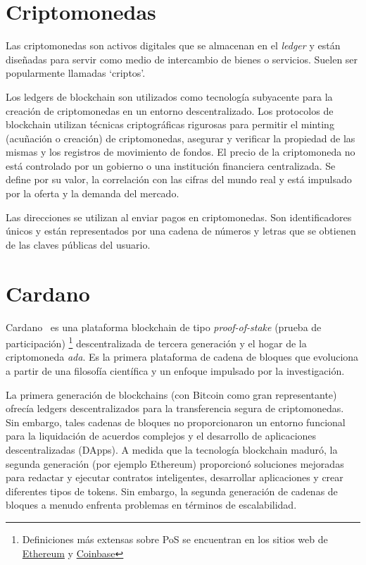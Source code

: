 \documentclass[12pt]{book}
\begin{document}
\section{Criptomonedas}

Las criptomonedas son activos digitales que se almacenan en el \textit{ledger} y están diseñadas para servir como medio de intercambio de bienes o servicios. Suelen ser popularmente llamadas `criptos'.

Los ledgers de blockchain son utilizados como tecnología subyacente para la creación de criptomonedas en un entorno descentralizado. Los protocolos de blockchain utilizan técnicas criptográficas rigurosas para permitir el minting (acuñación o creación) de criptomonedas, asegurar y verificar la propiedad de las mismas y los registros de movimiento de fondos. El precio de la criptomoneda no está controlado por un gobierno o una institución financiera centralizada. Se define por su valor, la correlación con las cifras del mundo real y está impulsado por la oferta y la demanda del mercado.

Las direcciones se utilizan al enviar pagos en criptomonedas. Son identificadores únicos y están representados por una cadena de números y letras que se obtienen de las claves públicas del usuario.

\section{Cardano}

Cardano~\cite{cardano_docs} es una plataforma blockchain de tipo \textit{proof-of-stake} (prueba de participación)
\footnote{Definiciones más extensas sobre PoS se encuentran en los sitios web de \href{https://ethereum.org/en/developers/docs/consensus-mechanisms/pos/}{Ethereum} y \href{https://www.coinbase.com/es/learn/crypto-basics/what-is-proof-of-work-or-proof-of-stake}{Coinbase}}
descentralizada de tercera generación y el hogar de la criptomoneda \textit{ada}. Es la primera plataforma de cadena de bloques que evoluciona a partir de una filosofía científica y un enfoque impulsado por la investigación.

La primera generación de blockchains (con Bitcoin como gran representante) ofrecía ledgers descentralizados para la transferencia segura de criptomonedas. Sin embargo, tales cadenas de bloques no proporcionaron un entorno funcional para la liquidación de acuerdos complejos y el desarrollo de aplicaciones descentralizadas (DApps). A medida que la tecnología blockchain maduró, la segunda generación (por ejemplo Ethereum) proporcionó soluciones mejoradas para redactar y ejecutar contratos inteligentes, desarrollar aplicaciones y crear diferentes tipos de tokens. Sin embargo, la segunda generación de cadenas de bloques a menudo enfrenta problemas en términos de escalabilidad.
\end{document}
